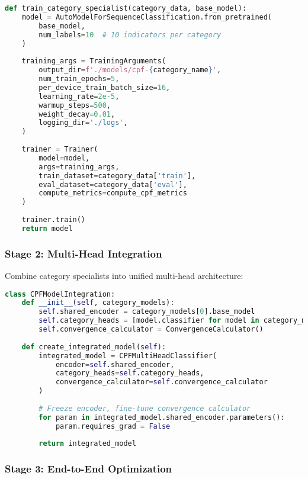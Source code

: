 \documentclass[11pt,a4paper]{article}
\begin{document}
\begin{lstlisting}[language=Python, caption=Category-Specific Training]
def train_category_specialist(category_data, base_model):
    model = AutoModelForSequenceClassification.from_pretrained(
        base_model,
        num_labels=10  # 10 indicators per category
    )
    
    training_args = TrainingArguments(
        output_dir=f'./models/cpf-{category_name}',
        num_train_epochs=5,
        per_device_train_batch_size=16,
        learning_rate=2e-5,
        warmup_steps=500,
        weight_decay=0.01,
        logging_dir='./logs',
    )
    
    trainer = Trainer(
        model=model,
        args=training_args,
        train_dataset=category_data['train'],
        eval_dataset=category_data['eval'],
        compute_metrics=compute_cpf_metrics
    )
    
    trainer.train()
    return model
\end{lstlisting}

\subsubsection{Stage 2: Multi-Head Integration}

Combine category specialists into unified multi-head architecture:

\begin{lstlisting}[language=Python, caption=Multi-Head Integration]
class CPFModelIntegration:
    def __init__(self, category_models):
        self.shared_encoder = category_models[0].base_model
        self.category_heads = [model.classifier for model in category_models]
        self.convergence_calculator = ConvergenceCalculator()
        
    def create_integrated_model(self):
        integrated_model = CPFMultiHeadClassifier(
            encoder=self.shared_encoder,
            category_heads=self.category_heads,
            convergence_calculator=self.convergence_calculator
        )
        
        # Freeze encoder, fine-tune convergence calculator
        for param in integrated_model.shared_encoder.parameters():
            param.requires_grad = False
            
        return integrated_model
\end{lstlisting}

\subsubsection{Stage 3: End-to-End Optimization}
\end{document}
